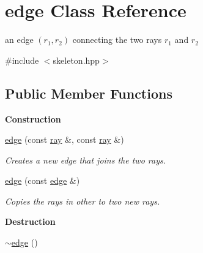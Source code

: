 \hypertarget{classedge}{}\section{edge Class Reference}
\label{classedge}


an edge $(r_1,r_2)$ connecting the two rays $ r_1 $ and $ r_2 $  




{\ttfamily \#include $<$skeleton.\+hpp$>$}

\subsection*{Public Member Functions}
\begin{Indent}\textbf{ Construction}\par
\begin{DoxyCompactItemize}
\item 
\mbox{\label{classedge_a80e74eefbaf1864ae1297fe2cea223ad}} 
\hyperlink{classedge_a80e74eefbaf1864ae1297fe2cea223ad}{edge} (const \hyperlink{classray}{ray} \&, const \hyperlink{classray}{ray} \&)
\begin{DoxyCompactList}\small\item\em Creates a new edge that joins the two rays. \end{DoxyCompactList}\item 
\mbox{\label{classedge_a93cf571922e2c7609ddeccaa24df1b59}} 
\hyperlink{classedge_a93cf571922e2c7609ddeccaa24df1b59}{edge} (const \hyperlink{classedge}{edge} \&)
\begin{DoxyCompactList}\small\item\em Copies the rays in {\ttfamily other} to two new rays. \end{DoxyCompactList}\end{DoxyCompactItemize}
\end{Indent}
\begin{Indent}\textbf{ Destruction}\par
\begin{DoxyCompactItemize}
\item 
\hyperlink{classedge_a6295b7f8e62fa95cd887fb78d64347f5}{$\sim$edge} ()
\end{DoxyCompactItemize}
\end{Indent}
